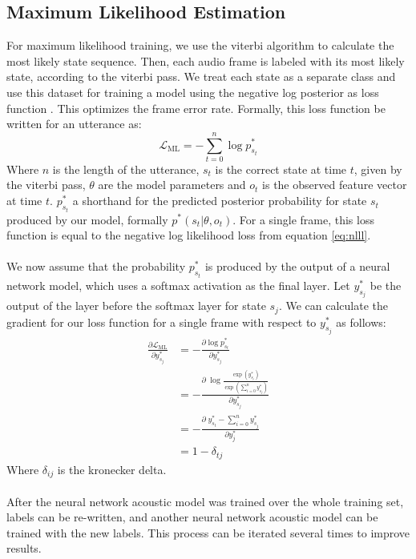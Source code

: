 \subsection{Maximum Likelihood Estimation}
For maximum likelihood training, we use the viterbi algorithm to calculate the most likely state sequence. Then, each audio frame is labeled with its most likely state, according to the viterbi pass. We treat each state as a separate class and use this dataset for training a model using the negative log posterior as loss function \cite{kitasr2018stueker}. This optimizes the frame error rate. Formally, this loss function be written for an utterance as:
\[
\mathcal{L}_{\text{ML}} = - \sum_{t = 0}^{n} \log p^*_{s_t}
\]
Where $n$ is the length of the utterance, $s_t$ is the correct state at time $t$, given by the viterbi pass, $\theta$ are the model parameters and $o_t$ is the observed feature vector at time $t$. $p^*_{s_t}$ a shorthand for the predicted posterior probability for state $s_t$ produced by our model, formally $p^*(s_t|\theta,o_t)$. For a single frame, this loss function is equal to the negative log likelihood loss from equation \ref{eq:nlll}. \\ \\
We now assume that the probability $p^*_{s_t}$ is produced by the output of a neural network model, which uses a softmax activation as the final layer. Let $y^*_{s_j}$ be the output of the layer before the softmax layer for state $s_j$. We can calculate the gradient for our loss function for a single frame with respect to $y^*_{s_j}$ as follows:
\begin{align*}
\frac{\partial\mathcal{L}_\text{ML}}{\partial y^*_{s_j}} &= -\frac{\partial \log p^*_{s_t}}{\partial y^*_{s_j}} \\
&= -\frac{\partial \; \log \frac{\exp \left(y^*_{s_t}\right)}{\exp\left(\sum_{i = 0}^{n} y^*_{s_j}\right)}}{\partial y^*_{s_j}} \\
&= -\frac{\partial \; y^*_{s_t} - \sum_{i = 0}^{n} y^*_{s_j}}{\partial y^*_j} \\
&= 1 - \delta_{tj}
\end{align*}
Where $\delta_{ij}$ is the kronecker delta. \\ \\
After the neural network acoustic model was trained over the whole training set, labels can be re-written, and another neural network acoustic model can be trained with the new labels. This process can be iterated several times to improve results. 
